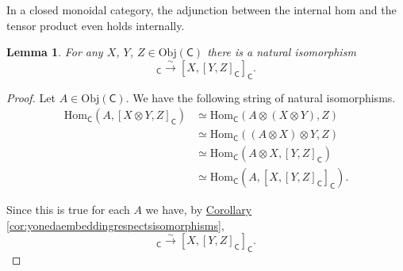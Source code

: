 \documentclass[a4paper,10pt]{scrreprt}
\newcommand{\Obj}{\mathrm{Obj}}
\newcommand{\Hom}{\mathrm{Hom}}
\theoremstyle{definition}
\theoremstyle{plain}
\newtheorem{lemma}{Lemma}[section]
\theoremstyle{remark}
\begin{document}
In a closed monoidal category, the adjunction between the internal hom and the tensor product even holds internally.
\begin{lemma}
  For any $X$, $Y$, $Z \in \Obj(\mathsf{C})$ there is a natural isomorphism
  \begin{equation*}
    [X \otimes Y, Z]_{\mathsf{C}} \stackrel{\sim}{\to} [X, [Y, Z]_{\mathsf{C}}]_{\mathsf{C}}.
  \end{equation*}
\end{lemma}
\begin{proof}
  Let $A \in \Obj(\mathsf{C})$. We have the following string of natural isomorphisms.
  \begin{align*}
    \Hom_{\mathsf{C}}(A, [X \otimes Y, Z]_{\mathsf{C}}) &\simeq \Hom_{\mathsf{C}}(A \otimes (X \otimes Y), Z) \\
    &\simeq \Hom_{\mathsf{C}}((A \otimes X) \otimes Y, Z) \\
    &\simeq \Hom_{\mathsf{C}}(A \otimes X, [Y, Z]_{\mathsf{C}}) \\
    &\simeq \Hom_{\mathsf{C}}(A, [X, [Y, Z]_{\mathsf{C}}]_{\mathsf{C}}).
  \end{align*}

  Since this is true for each $A$ we have, by \hyperref[cor:yonedaembeddingrespectsisomorphisms]{Corollary \ref*{cor:yonedaembeddingrespectsisomorphisms}},
  \begin{equation*}
    [X \otimes Y, Z]_{\mathsf{C}} \stackrel{\sim}{\to} [X, [Y, Z]_{\mathsf{C}}]_{\mathsf{C}}.
  \end{equation*}
\end{proof}
\end{document}
